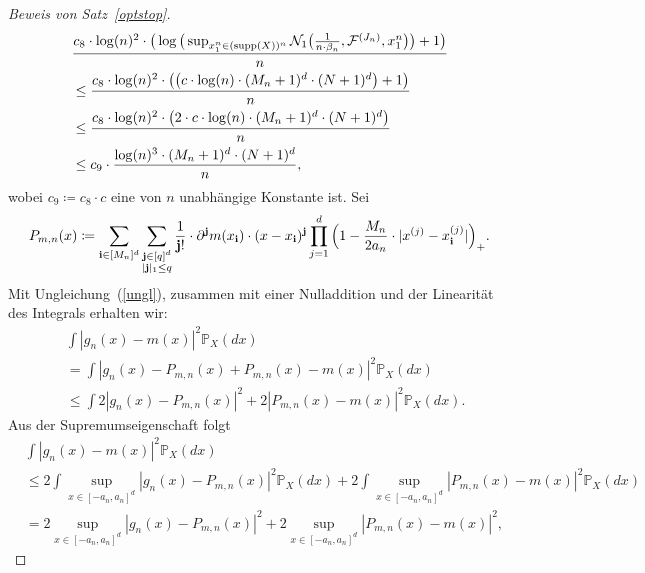 \begin{proof}[Beweis von Satz~\ref{optstop}]
\begin{equation}
\label{lem9sol}
\begin{split}
& \frac{c_8 \cdot \log(n)^2 \cdot \big(\log\big(\sup_{x_1^n \in (\operatorname{supp}(X))^n}\mathcal{N}_1\big(\frac{1}{n \cdot \beta_n},\mathcal{F}^{(J_n)},x_1^n\big)\big) + 1\big)}{n} \\
& \leq \frac{c_8 \cdot \log(n)^2 \cdot \big(\big(c \cdot \log(n) \cdot (M_n + 1)^d \cdot (N + 1)^d \big) + 1\big)}{n} \\
& \leq \frac{c_8 \cdot \log(n)^2 \cdot \big(2 \cdot c \cdot \log(n) \cdot (M_n + 1)^d \cdot (N + 1)^d\big)}{n} \\
& \leq c_{9} \cdot \frac{\log(n)^3 \cdot (M_n + 1)^d \cdot (N + 1)^d}{n},
\end{split}
\end{equation}
wobei $c_9 \coloneqq c_8 \cdot c$ eine von $n$ unabhängige Konstante ist.
Sei 
\begin{equation*}
\begin{split}
P_{m,n}(x) \coloneqq \sum_{\mathbf{i} \in [M_n]^d} \sum_{\substack{ \mathbf{j} \in [q]^d \\ |\mathbf{j}|_1 \leq q}} \frac{1}{\mathbf{j}!} \cdot \partial^{\mathbf{j}} m (x_{\mathbf{i}}) \cdot (x - x_{\mathbf{i}})^{\mathbf{j}} \prod_{j = 1}^d\Big(1 - \frac{M_n}{2a_n} \cdot |x^{(j)} - x_{\mathbf{i}}^{(j)}|\Big)_+. 
\end{split}
\end{equation*}
Mit Ungleichung~(\ref{ungl}), zusammen mit einer Nulladdition und der Linearität des Integrals erhalten wir:
\begin{equation*}
\begin{split}
& \int |g_n(x) - m(x)|^2 \mathds{P}_X(dx) \\
& = \int |g_n(x) - P_{m,n}(x) + P_{m,n}(x) - m(x)|^2 \mathds{P}_X(dx) \\
& \leq \int 2 |g_n(x) - P_{m,n}(x)|^2 + 2 |P_{m,n}(x) - m(x)|^2 \mathds{P}_X(dx).
\end{split}
\end{equation*}
Aus der Supremumseigenschaft folgt
\begin{equation}
\label{gnmx}
\begin{split}
& \int |g_n(x) - m(x)|^2 \mathds{P}_X(dx) \\
& \leq 2 \int \sup_{x \in [-a_n, a_n]^d} |g_n(x) - P_{m,n}(x)|^2 \mathds{P}_X(dx) + 2 \int \sup_{x \in [-a_n, a_n]^d} |P_{m,n}(x) - m(x)|^2 \mathds{P}_X(dx) \\
& = 2 \sup_{x \in [-a_n, a_n]^d} |g_n(x) - P_{m,n}(x)|^2 + 2 \sup_{x \in [-a_n, a_n]^d} |P_{m,n}(x) - m(x)|^2, 

\end{split}
\end{equation}
\end{proof}
